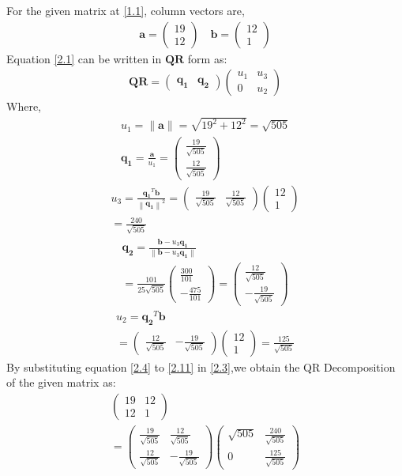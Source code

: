 \documentclass[journal,12pt,twocolumn]{IEEEtran}
\let\vec\mathbf
\numberwithin{equation}{subsection}
\newcommand{\myvec}[1]{\ensuremath{\begin{pmatrix}#1\end{pmatrix}}}
\newcommand{\norm}[1]{\left\lVert#1\right\rVert}
\begin{document}
For the given matrix at \ref{1.1}, column vectors are,
\begin{align}
    \vec{a}=\myvec{19\\12} \quad \vec{b}=\myvec{12\\1} \label{2.2}
\end{align}
Equation  \ref{2.1} can be written in $\vec{Q}\vec{R}$ form as:
\begin{align}
    \vec{Q}\vec{R} = \myvec{\vec{q_1}&\vec{q_2}} \myvec{u_1&u_3\\0&u_2}  \label{2.3}
\end{align}
Where,
\begin{align}
u_1 = \norm{\vec{a}} = \sqrt{19^2+12^2} = \sqrt{505} \label{2.4}\\
\vec{q_1} = \frac{\vec{a}}{u_1} = \myvec{\frac{19}{\sqrt{505}}\\ \frac{12}{\sqrt{505}}}
\end{align}
\begin{multline}
u_3 = \frac{\vec{q_1}^T\vec{b}}{\norm{\vec{q_1}}^2} = \myvec{\frac{19}{\sqrt{505}}& \frac{12}{\sqrt{505}}}\myvec{12\\1}\\= \frac{240}{\sqrt{505}}
\end{multline}
\begin{multline}
\vec{q_2} = \frac{\vec{b} - u_3 \vec{q_1}}{\norm{\vec{b} - u_3 \vec{q_1}}} \\=  \frac{101}{25\sqrt{505}}\myvec{\frac{300}{101}\\ -\frac{475}{101}}= \myvec{\frac{12}{\sqrt{505}} \\ -\frac{19}{\sqrt{505}}}
\end{multline}
\begin{multline}
u_2 = {\vec{q_2}^T\vec{b}} \\= \myvec{\frac{12}{\sqrt{505}} & -\frac{19}{\sqrt{505}}}\myvec{12\\1}=\frac{125}{\sqrt{505}}\label{2.11}
\end{multline}
By substituting equation  \ref{2.4} to  \ref{2.11} in  \ref{2.3},we obtain
the QR Decomposition of the given matrix as:
\begin{multline}
    \myvec{19&12\\12&1} \\= \myvec{\frac{19}{\sqrt{505}}& \frac{12}{\sqrt{505}}\\\frac{12}{\sqrt{505}}&-\frac{19}{\sqrt{505}}}\myvec{\sqrt{505} &\frac{240}{\sqrt{505}}\\0&\frac{125}{\sqrt{505}}}
\end{multline}
\end{document}
